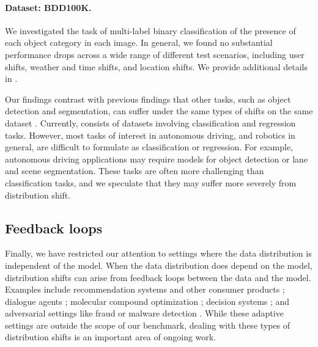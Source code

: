 \paragraph{Dataset: BDD100K.}
We investigated the task of multi-label binary classification of the presence of each object
category in each image. In general, we found no substantial performance drops across a wide range of
different test scenarios, including user shifts, weather and time shifts, and location shifts. We
provide additional details in .

Our findings contrast with previous findings that other tasks, such as object detection and
segmentation, can suffer under the same types of shifts on the same dataset
\citep{yu20cvpr,dai18itsc}. Currently, \Wilds consists of datasets involving classification and
regression tasks. However, most tasks of interest in autonomous driving, and robotics in general,
are difficult to formulate as classification or regression. For example, autonomous driving
applications may require models for object detection or lane and scene segmentation. These tasks are
often more challenging than classification tasks, and we speculate that they may suffer more
severely from distribution shift.

\subsection{Feedback loops}
Finally, we have restricted our attention to settings where the data distribution is independent of the model. When the data distribution does depend on the model, distribution shifts can arise from feedback loops between the data and the model. Examples include recommendation systems and other consumer products \citep{bottou2013counterfactual,hashimoto2018repeated}; dialogue agents \citep{li2017dialogue};
molecular compound optimization \citep{cuccarese2020functional,reker2020practical};
decision systems \citep{liu2018delayed,damour2020fairness}; and adversarial settings like fraud or malware detection \citep{rigaki2018bringing}.
While these adaptive settings are outside the scope of our benchmark,
dealing with these types of distribution shifts is an important area of ongoing work.

